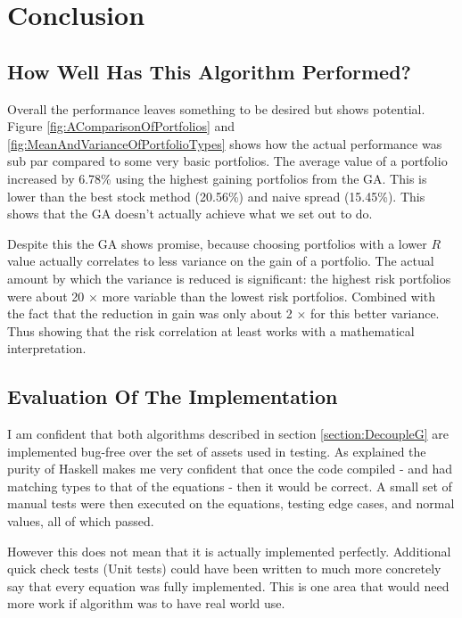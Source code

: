 \documentclass[11pt]{article}
\begin{document}
\section{Conclusion}

\subsection{How Well Has This Algorithm Performed?}

    Overall the performance leaves something to be desired but shows potential. Figure
    \ref{fig:AComparisonOfPortfolios} and \ref{fig:MeanAndVarianceOfPortfolioTypes}
    shows how the actual performance was
    sub par compared to some very basic portfolios. The average value of a portfolio
    increased by 6.78\% using the highest gaining portfolios from the GA. This is lower
    than the best stock method (20.56\%) and naive spread (15.45\%). This shows
    that the GA doesn't actually achieve what we set out to do.

    Despite this the GA shows promise, because choosing portfolios
    with a lower \(R\) value actually correlates to less variance on the gain
    of a portfolio. The actual amount by which the variance is reduced
    is significant: the highest risk portfolios were about 20 \(\times\) more
    variable than the lowest risk portfolios. Combined with the fact that the
    reduction in gain was only about 2 \(\times\) for this better
    variance. Thus showing that the risk correlation at least works with a mathematical
    interpretation.

\subsection{Evaluation Of The Implementation}

    I am confident that both algorithms described in section \ref{section:DecoupleG}
    are implemented bug-free over the set of assets used in testing. As explained
    the purity of Haskell makes me very confident that once the code compiled - and
    had matching types to that of the equations - then it would be correct. A small
    set of manual tests were then executed on the equations, testing edge cases,
    and normal values, all of which passed.

    However this does not mean that it is actually implemented perfectly. Additional
    quick check tests \cite{QuickCheck} (Unit tests) could have been written to
    much more concretely say that every equation was fully implemented. This is
    one area that would need more work if algorithm was to have real world use.
\end{document}

